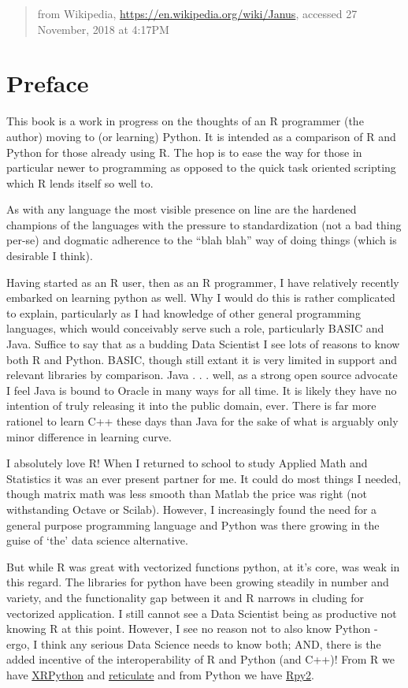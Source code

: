 \documentclass[]{book}
\theoremstyle{definition}
\theoremstyle{definition}
\theoremstyle{definition}
\theoremstyle{remark}
\begin{document}
\begin{quote}
from Wikipedia, \url{https://en.wikipedia.org/wiki/Janus}, accessed 27
November, 2018 at 4:17PM
\end{quote}

\section{Preface}\label{preface}

This book is a work in progress on the thoughts of an R programmer (the
author) moving to (or learning) Python. It is intended as a comparison
of R and Python for those already using R. The hop is to ease the way
for those in particular newer to programming as opposed to the quick
task oriented scripting which R lends itself so well to.

As with any language the most visible presence on line are the hardened
champions of the languages with the pressure to standardization (not a
bad thing per-se) and dogmatic adherence to the ``blah blah'' way of
doing things (which is desirable I think).

Having started as an R user, then as an R programmer, I have relatively
recently embarked on learning python as well. Why I would do this is
rather complicated to explain, particularly as I had knowledge of other
general programming languages, which would conceivably serve such a
role, particularly BASIC and Java. Suffice to say that as a budding Data
Scientist I see lots of reasons to know both R and Python. BASIC, though
still extant it is very limited in support and relevant libraries by
comparison. Java . . . well, as a strong open source advocate I feel
Java is bound to Oracle in many ways for all time. It is likely they
have no intention of truly releasing it into the public domain, ever.
There is far more rationel to learn C++ these days than Java for the
sake of what is arguably only minor difference in learning curve.

I absolutely love R! When I returned to school to study Applied Math and
Statistics it was an ever present partner for me. It could do most
things I needed, though matrix math was less smooth than Matlab the
price was right (not withstanding Octave or Scilab). However, I
increasingly found the need for a general purpose programming language
and Python was there growing in the guise of `the' data science
alternative.

But while R was great with vectorized functions python, at it's core,
was weak in this regard. The libraries for python have been growing
steadily in number and variety, and the functionality gap between it and
R narrows in cluding for vectorized application. I still cannot see a
Data Scientist being as productive not knowing R at this point. However,
I see no reason not to also know Python - ergo, I think any serious Data
Science needs to know both; AND, there is the added incentive of the
interoperability of R and Python (and C++)! From R we have
\href{https://cran.cnr.berkeley.edu/web/packages/XRPython/index.html}{XRPython}
and
\href{https://cran.cnr.berkeley.edu/web/packages/reticulate/index.html}{reticulate}
and from Python we have \href{https://rpy2.bitbucket.io/}{Rpy2}.
\end{document}
